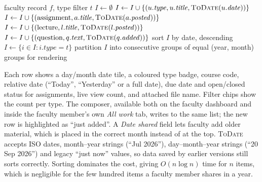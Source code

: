 \documentclass[conference]{IEEEtran}
\begin{document}
\begin{algorithm}[t]
\caption{Building the All Work timeline}
\label{alg:timeline}
\small
\begin{algorithmic}[1]
\Require faculty record $f$, type filter $t$
\State $I \gets \emptyset$
 \State $I \gets I \cup \{(u.\mathit{type}, u.\mathit{title}, \textsc{ToDate}(u.\mathit{date}))\}$ \EndFor
{} \State $I \gets I \cup \{(\text{assignment}, a.\mathit{title}, \textsc{ToDate}(a.\mathit{posted}))\}$ \EndFor
{} \State $I \gets I \cup \{(\text{lecture}, l.\mathit{title}, \textsc{ToDate}(l.\mathit{posted}))\}$ \EndFor
{} \State $I \gets I \cup \{(\text{question}, q.\mathit{text}, \textsc{ToDate}(q.\mathit{added}))\}$ \EndFor
\State sort $I$ by date, descending
 \State $I \gets \{i \in I : i.\mathit{type} = t\}$ \EndIf
\State partition $I$ into consecutive groups of equal (year, month)
\State \Return groups for rendering
\end{algorithmic}
\end{algorithm}

Each row shows a day/month date tile, a coloured type badge, course code, relative date (``Today'', ``Yesterday'' or a full date), due date and open/closed status for assignments, live view count, and attached file name. Filter chips show the count per type. The composer, available both on the faculty dashboard and inside the faculty member's own \emph{All work} tab, writes to the same list; the new row is highlighted as ``just added''. A \emph{Date shared} field lets faculty add older material, which is placed in the correct month instead of at the top. \textsc{ToDate} accepts ISO dates, month--year strings (``Jul 2026''), day--month--year strings (``20 Sep 2026'') and legacy ``just now'' values, so data saved by earlier versions still sorts correctly. Sorting dominates the cost, giving $O(n\log n)$ time for $n$ items, which is negligible for the few hundred items a faculty member shares in a year.
\end{document}
